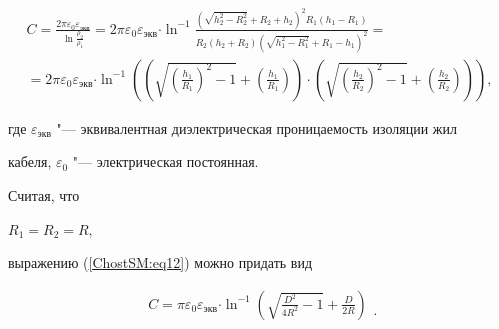 \begin{multline}

\label{ChostSM:eq12}

 C = \frac{2\pi \varepsilon _0 \varepsilon _{\text{экв}} }{\ln \frac{\rho _2 }{\rho 

_1 }} = {2\pi \varepsilon _0 \varepsilon _{\text{экв}} }{\cdot \ln^{-1} \frac{\left( 

{\sqrt {h_2 ^2 - R_2 ^2} + R_2 + h_2 } \right)^2R_1 (h_1 - R_1 )}{R_2 (h_2 + 

R_2 )\left( {\sqrt {h_1 ^2 - R_1 ^2} + R_1 - h_1 } \right)^2}} = \\ 

 = {2\pi \varepsilon _0 \varepsilon _{\text{экв}} }{\cdot \ln^{-1} \left( {\left( {\sqrt 

{\left( {\frac{h_1 }{R_1 }} \right)^2 - 1} + \left( {\frac{h_1 }{R_1 }} 

\right)} \right) \cdot \left( {\sqrt {\left( {\frac{h_2 }{R_2 }} \right)^2 - 

1} + \left( {\frac{h_2 }{R_2 }} \right)} \right)} \right)},

\end{multline}

где $\varepsilon _{\text{экв}}$ "--- эквивалентная диэлектрическая проницаемость изоляции жил 

кабеля, $\varepsilon _{0}$ "--- электрическая постоянная. 



Считая, что

$

\label{ChostSM:eq13}

R_1 = R_2 = R,

$

выражению (\ref{ChostSM:eq12}) можно придать вид

\begin{equation}

\label{ChostSM:eq14}

\begin{array}{l}

 C = {\pi \varepsilon _0 \varepsilon _{\text{экв}} }{\cdot \ln^{-1} \left( {\sqrt 

{\frac{D^2}{4R^2} - 1} + \frac{D}{2R}} \right)} \\ 

 \\ 

 \end{array}.

\end{equation}







